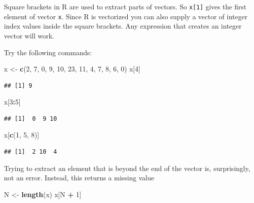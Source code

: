 \documentclass[
]{book}
\newenvironment{Shaded}{\begin{snugshade}}{\end{snugshade}}
\newcommand{\DecValTok}[1]{\textcolor[rgb]{0.00,0.00,0.81}{#1}}
\newcommand{\FunctionTok}[1]{\textcolor[rgb]{0.13,0.29,0.53}{\textbf{#1}}}
\newcommand{\NormalTok}[1]{#1}
\newcommand{\OtherTok}[1]{\textcolor[rgb]{0.56,0.35,0.01}{#1}}
\newcommand{\SpecialCharTok}[1]{\textcolor[rgb]{0.81,0.36,0.00}{\textbf{#1}}}
\begin{document}
Square brackets in R are used to extract parts of vectors. So
\texttt{x{[}1{]}} gives the first element of vector \texttt{x}. Since R is
vectorized you can also supply a vector of integer index values inside
the square brackets. Any expression that creates an integer vector
will work.

Try the following commands:

\begin{Shaded}
\begin{Highlighting}[]
\NormalTok{x }\OtherTok{\textless{}{-}} \FunctionTok{c}\NormalTok{(}\DecValTok{2}\NormalTok{, }\DecValTok{7}\NormalTok{, }\DecValTok{0}\NormalTok{, }\DecValTok{9}\NormalTok{, }\DecValTok{10}\NormalTok{, }\DecValTok{23}\NormalTok{, }\DecValTok{11}\NormalTok{, }\DecValTok{4}\NormalTok{, }\DecValTok{7}\NormalTok{, }\DecValTok{8}\NormalTok{, }\DecValTok{6}\NormalTok{, }\DecValTok{0}\NormalTok{)}
\NormalTok{x[}\DecValTok{4}\NormalTok{]}
\end{Highlighting}
\end{Shaded}

\begin{verbatim}
## [1] 9
\end{verbatim}

\begin{Shaded}
\begin{Highlighting}[]
\NormalTok{x[}\DecValTok{3}\SpecialCharTok{:}\DecValTok{5}\NormalTok{]}
\end{Highlighting}
\end{Shaded}

\begin{verbatim}
## [1]  0  9 10
\end{verbatim}

\begin{Shaded}
\begin{Highlighting}[]
\NormalTok{x[}\FunctionTok{c}\NormalTok{(}\DecValTok{1}\NormalTok{, }\DecValTok{5}\NormalTok{, }\DecValTok{8}\NormalTok{)]}
\end{Highlighting}
\end{Shaded}

\begin{verbatim}
## [1]  2 10  4
\end{verbatim}

Trying to extract an element that is beyond the end of the vector is,
surprisingly, not an error. Instead, this returns a missing value

\begin{Shaded}
\begin{Highlighting}[]
\NormalTok{N }\OtherTok{\textless{}{-}} \FunctionTok{length}\NormalTok{(x)}
\NormalTok{x[N }\SpecialCharTok{+} \DecValTok{1}\NormalTok{]}
\end{Highlighting}
\end{Shaded}
\end{document}
